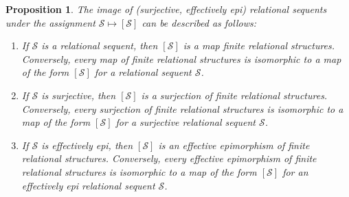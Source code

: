 \documentclass[a4paper]{article}
\newtheorem{proposition}[theorem]{Proposition}
\theoremstyle{remark}
\theoremstyle{definition}
\begin{document}
\begin{proposition}
  \label{prop:semantics-relational-sequents}
  The image of (surjective, effectively epi) relational sequents under the assignment $\mathcal{S} \mapsto [\mathcal{S}]$ can be described as follows:
  \begin{enumerate}
    \item
      \label{itm:semantics-arbitrary-relational-sequent}
      If $\mathcal{S}$ is a relational sequent, then $[\mathcal{S}]$ is a map finite relational structures.
      Conversely, every map of finite relational structures is isomorphic to a map of the form $[\mathcal{S}]$ for a relational sequent $\mathcal{S}$.
    \item
      \label{itm:semantics-surjective-relational-sequent}
      If $\mathcal{S}$ is surjective, then $[\mathcal{S}]$ is a surjection of finite relational structures.
      Conversely, every surjection of finite relational structures is isomorphic to a map of the form $[\mathcal{S}]$ for a surjective relational sequent $\mathcal{S}$.
    \item
      \label{itm:semantics-quotient-relational-sequent}
      If $\mathcal{S}$ is effectively epi, then $[\mathcal{S}]$ is an effective epimorphism of finite relational structures.
      Conversely, every effective epimorphism of finite relational structures is isomorphic to a map of the form $[\mathcal{S}]$ for an effectively epi relational sequent $\mathcal{S}$.
  \end{enumerate}
\end{proposition}
\end{document}
